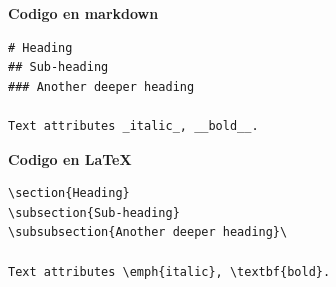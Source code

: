\documentclass[11pt]{beamer}
\begin{document}
\begin{frame}

\end{frame}




\begin{frame}[fragile]

\textbf{Codigo en markdown}


\begin{verbatim}
# Heading
## Sub-heading
### Another deeper heading
 
Text attributes _italic_, __bold__.

\end{verbatim}


\vspace{1cm}
\textbf{Codigo en \LaTeX}

\begin{verbatim}
\section{Heading}
\subsection{Sub-heading}
\subsubsection{Another deeper heading}\

Text attributes \emph{italic}, \textbf{bold}.

\end{verbatim}



\end{frame}
\end{document}
